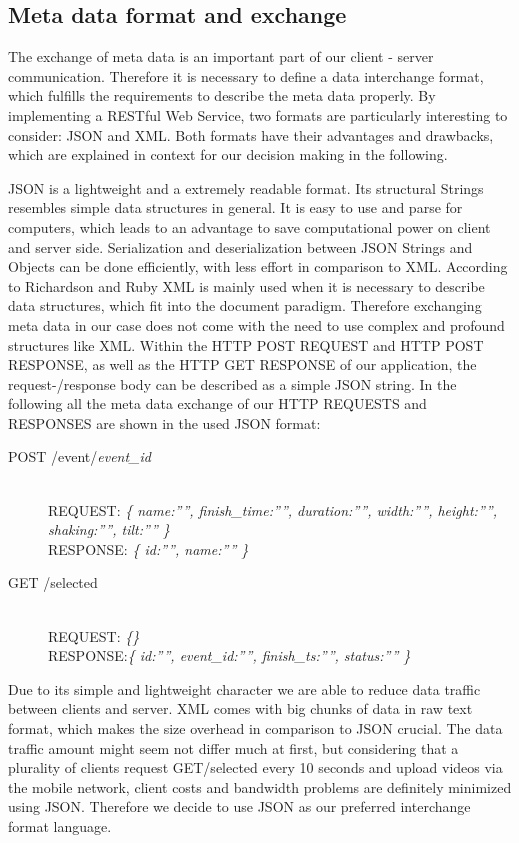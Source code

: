 \documentclass[conference]{IEEEtran}
\begin{document}
\subsection{Meta data format and exchange}
The exchange of meta data is an important part of our client - server communication.
Therefore it is necessary to define a data interchange format, which fulfills the requirements to describe the meta data properly.
By implementing a RESTful Web Service, two formats are particularly interesting to consider: JSON and XML.
Both formats have their advantages and drawbacks, which are explained in context for our decision making in the following.

JSON is a lightweight and a extremely readable format. Its structural Strings resembles simple data structures in general. 
It is easy to use and parse for computers, which leads to an advantage to save computational power on client and server side. 
Serialization and deserialization between JSON Strings and Objects can be done efficiently, with less effort in comparison to XML.
According to Richardson and Ruby XML is mainly used when it is necessary to describe data structures, which fit into the document paradigm. 
Therefore exchanging meta data in our case does not come with the need to use complex and profound structures like XML. 
Within the HTTP POST REQUEST and HTTP POST RESPONSE, as well as the HTTP GET RESPONSE  of our application, 
the request-/response body can be described as a simple JSON string. In the following all the meta data exchange of our HTTP REQUESTS and 
RESPONSES are shown in the used JSON format:

\begin{description}
	\item[POST /event/\textit{event\_id}]\hfill\\	
				REQUEST: \textit{\{ name:””, finish\_time:””, duration:””, width:””, height:””, shaking:””, tilt:”” \}}\hfill \\
				RESPONSE: \textit{\{ id:””, name:”” \}}

	\item[GET /selected]\hfill\\		
				REQUEST: \textit{\{\}}\hfill \\
				RESPONSE:\textit{\{ id:””, event\_id:””, finish\_ts:””, status:”” \}}

\end{description}

Due to its simple and lightweight character we are able to reduce data traffic between clients and server. 
XML comes with big chunks of data in raw text format, which makes the size overhead in comparison to JSON crucial.
The data traffic amount might seem not differ much at first, but considering that a plurality of clients request GET/selected every 10 seconds and upload videos via the mobile network, client costs and bandwidth problems are definitely minimized using JSON. Therefore we decide to use JSON as our preferred interchange format language.
\end{document}
